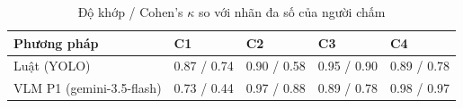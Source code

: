 \begin{table}[t]
\centering
\caption{Độ khớp / Cohen's $\kappa$ so với nhãn đa số của người chấm}
\footnotesize
\begin{tabular}{lllll}
\hline
Phương pháp & C1 & C2 & C3 & C4 \\
\hline
Luật (YOLO) & 0.87 / 0.74 & 0.90 / 0.58 & 0.95 / 0.90 & 0.89 / 0.78 \\
VLM P1 (gemini-3.5-flash) & 0.73 / 0.44 & 0.97 / 0.88 & 0.89 / 0.78 & 0.98 / 0.97 \\
\hline
\end{tabular}
\end{table}